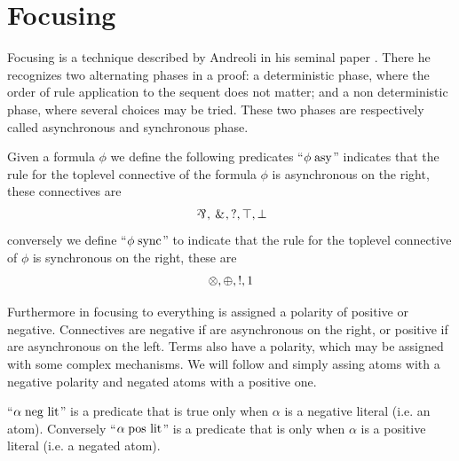 \documentclass[a4paper, 12pt, tesi, english]{report}
\begin{document}
\section{Focusing}
Focusing is a technique described by Andreoli in his seminal paper \cite{Focusing}.
There he recognizes two alternating phases in a proof: a deterministic phase, where the order of rule application to the sequent does not matter; and a non deterministic phase, where several choices may be tried.
These two phases are respectively called asynchronous and synchronous phase.
\begin{define}
	Given a formula $\phi$ we define the following predicates
	``$\phi \; \text{asy}$'' indicates that the rule for the toplevel connective of the formula $\phi$ is asynchronous on the right, these connectives are 
	$$ \llpar\!, \llwith\!, \llwn{}, \lltop, \llbot $$
	conversely we define ``$\phi \; \text{sync}$'' to indicate that the rule for the toplevel connective of $\phi$ is synchronous on the right, these are
	$$ \otimes, \oplus, !, 1 $$
\end{define}
Furthermore in focusing to everything is assigned a polarity of positive or negative.
Connectives are negative if are asynchronous on the right, or positive if are asynchronous on the left.
Terms also have a polarity, which may be assigned with some complex mechanisms.
We will follow \cite{LiangMiller} and simply assing atoms with a negative polarity and negated atoms with a positive one.
\begin{define}
	``$\alpha \; \text{neg lit}$'' is a predicate that is true only when $\alpha$ is a negative literal (i.e. an atom).
	Conversely ``$\alpha \; \text{pos lit}$'' is a predicate that is only when $\alpha$ is a positive literal (i.e. a negated atom).
\end{define}
\end{document}
